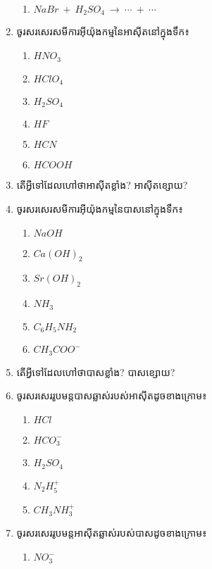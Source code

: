 \documentclass[a4paper]{report}
\begin{document}
\begin{enumerate}[1]
\begin{enumerate}[a]
			\item $NaBr~+~H_2SO_4~\rightarrow~\cdots~+~\cdots$
		\end{enumerate}
		\item ចូរសរសេរសមីការអ៊ីយ៉ុងកម្មនៃអាស៊ីតនៅក្នុងទឹក៖
		\begin{multicols}{3}
			\begin{enumerate}[a]
				\item $HNO_3$
				\item $HClO_4$
				\item $H_2SO_4$
				\item $HF$
				\item $HCN$
				\item $HCOOH$
			\end{enumerate}
		\end{multicols}
		\item តើអ្វីទៅដែលហៅថាអាស៊ីតខ្លាំង? អាស៊ីតខ្សោយ?
		\item ចូរសរសេរសមីការអ៊ីយ៉ុងកម្មនៃបាសនៅក្នុងទឹក៖
		\begin{multicols}{3}
			\begin{enumerate}[a]
				\item $NaOH$
				\item $Ca(OH)_2$
				\item $Sr(OH)_2$
				\item $NH_3$
				\item $C_6H_5NH_2$
				\item $CH_3COO^-$
			\end{enumerate}
		\end{multicols}
		\item តើអ្វីទៅដែលហៅថាបាសខ្លាំង? បាសខ្សោយ?
		\item ចូរសរសេររូបមន្តបាសឆ្លាស់របស់អាស៊ីតដូចខាងក្រោម៖
		\begin{multicols}{5}
			\begin{enumerate}[a]
				\item $HCl$
				\item $HCO_3^{-}$
				\item $H_2SO_4$
				\item $N_2H_5^{+}$
				\item $CH_3NH_3^{+}$
			\end{enumerate}
		\end{multicols}
		\item ចូរសរសេររូបមន្តអាស៊ីតឆ្លាស់របស់បាសដូចខាងក្រោម៖
		\begin{multicols}{5}
			\begin{enumerate}[a]
				\item $NO_3^{-}$

\end{enumerate}
\end{multicols}
\end{enumerate}
\end{document}
